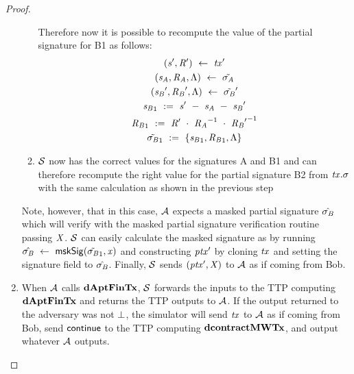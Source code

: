 \begin{proof}
\begin{enumerate}
\begin{enumerate}
            Therefore now it is possible to recompute the value of the partial signature for B1 as follows:
            \begin{gather*}
                ({\mathit{s}}', {\mathit{R}}') ~\leftarrow~ {\mathit{tx}}' \\
                (\mathit{s}_{\mathit{A}}, \mathit{R}_{\mathit{A}}, \Lambda) ~\leftarrow~ \tilde{\sigma_{\mathit{A}}} \\
                ({\mathit{s}_{\mathit{B}}}', {\mathit{R}_{\mathit{B}}}', \Lambda) ~\leftarrow~ {\tilde{\sigma_{\mathit{B}}}}' \\
                {\mathit{s}_{\mathit{B}}}_1 ~:=~ {\mathit{s}}' ~-~ \mathit{s}_{\mathit{A}} ~-~ {\mathit{s}_{\mathit{B}}}' \\
                {\mathit{R}_{\mathit{B}}}_1 ~:=~ {\mathit{R}}' ~\cdot~ {\mathit{R}_{\mathit{A}}}^{-1} ~\cdot~ {{\mathit{R}_{\mathit{B}}}'}^{-1} \\
                {\tilde{\sigma_{\mathit{B}}}}_1 ~:=~ \{ {\mathit{s}_{\mathit{B}}}_1, {\mathit{R}_{\mathit{B}}}_1, \Lambda \}
            \end{gather*}
            \item $\mathcal{S}$ now has the correct values for the signatures A and B1 and can therefore recompute the right value for the partial signature B2 from $\mathit{tx}.\sigma$ with the same calculation as shown in the previous step
        \end{enumerate}
        Note, however, that in this case, $\mathcal{A}$ expects a masked partial signature $\hat{\sigma_{\mathit{B}}}$ which will verify with the masked partial signature verification routine passing $\mathit{X}$.
        $\mathcal{S}$ can easily calculate the masked signature as by running $\hat{\sigma_{\mathit{B}}} ~\leftarrow~ \mathsf{mskSig}({\tilde{\sigma_{\mathit{B}}}_1}, \mathit{x})$ and constructing ${\mathit{ptx}}'$ by cloning $\mathit{tx}$ and setting the signature field to $\hat{\sigma_{\mathit{B}}}$.
        Finally, $\mathcal{S}$ sends $({\mathit{ptx}}',\mathit{X})$ to $\mathcal{A}$ as if coming from Bob.
        \item When $\mathcal{A}$ calls $\mathbf{dAptFinTx}$, $\mathcal{S}$ forwards the inputs to the TTP computing $\mathbf{dAptFinTx}$ and returns the TTP outputs to $\mathcal{A}$.
        If the output returned to the adversary was not $\bot$, the simulator will send $\mathit{tx}$ to $\mathcal{A}$ as if coming from Bob, send $\mathsf{continue}$ to the TTP computing $\mathbf{dcontractMWTx}$, and output whatever $\mathcal{A}$ outputs.
    \end{enumerate}


\end{proof}
